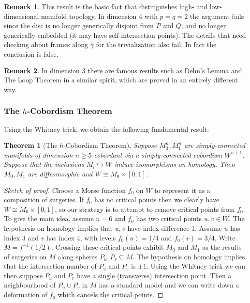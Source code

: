 \documentclass{article}
\newtheorem*{theorem}{Theorem}
\theoremstyle{definition}
\newtheorem*{remark}{Remark}
\begin{document}
\begin{remark}
    This result is the basic fact that distinguishes high- and low-dimensional
    manifold topology. In dimension 4 with $p=q=2$ the argument fails since the
    disc is no longer generically disjoint from $P$ and $Q$, and no longer
    generically embedded (it may have self-intersection points). The details
    that need checking about frames along $\gamma$ for the trivialization also
    fail. In fact the conclusion is false.
\end{remark}

\begin{remark}
    In dimension 3 there are famous results such as Dehn's Lemma and The Loop
    Theorem in a similar spirit, which are proved in an entirely different way.
\end{remark}

\subsubsection*{The $h$-Cobordism Theorem}

Using the Whitney trick, we obtain the following fundamental result:

\begin{theorem}[The $h$-Cobordism Theorem]
    Suppose $M_0^n,M_1^n$ are simply-connected manifolds of dimension $n\ge5$
    cobordant via a simply-connected cobordism $W^{n+1}$. Suppose that the
    inclusions $M_i\hookrightarrow W$ induce isomorphisms on homology. Then
    $M_0,M_1$ are diffeomorphic and $W\cong M_0\times[0,1]$.
\end{theorem}

\begin{proof}[Sketch of proof]
    Choose a Morse function $f_0$ on $W$ to represent it as a composition of
    surgeries. If $f_0$ has no critical points then we clearly have
    $W\cong M_0\times[0,1]$, so our strategy is to attempt to remove critical
    points from $f_0$. To give the main idea, assume $n=6$ and $f_0$ has two
    critical points $u,v\in W$. The hypothesis on homology implies that $u,v$
    have index difference 1. Assume $u$ has index 3 and $v$ has index 4, with
    levels $f_0(u)=1/4$ and $f_0(v)=3/4$. Write $M=f^{-1}(1/2)$. Crossing these
    critical points exhibit $M_0$ and $M_1$ as the results of surgeries on $M$
    along spheres $P_u,P_v\subseteq M$. The hypothesis on homology implies that
    the intersection number of $P_u$ and $P_v$ is $\pm1$. Using the Whitney
    trick we can then suppose $P_u$ and $P_v$ have a single (transverse)
    intersection point. Then a neighbourhood of $P_u\cup P_v$ in $M$ has a
    standard model and we can write down a deformation of $f_0$ which cancels
    the critical points.
\end{proof}
\end{document}
